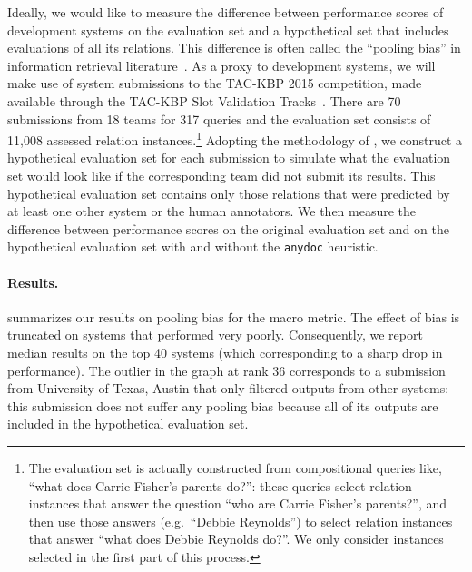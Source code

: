 Ideally, we would like to measure the difference between performance scores of development systems on the evaluation set and a hypothetical set that includes evaluations of all its relations.
This difference is often called the ``pooling bias'' in information retrieval literature~\citep{}. %
As a proxy to development systems, we will make use of system submissions to the TAC-KBP 2015 competition, made available through the TAC-KBP Slot Validation Tracks~\citep{}.
There are 70 submissions from 18 teams for 317 queries and the evaluation set consists of 11,008 assessed relation instances.\footnote{%
  The evaluation set is actually constructed from compositional queries like, ``what does Carrie Fisher's parents do?'':
  these queries select relation instances that answer the question ``who are Carrie Fisher's parents?'', and then use those answers (e.g.\ ``Debbie Reynolds'') to select relation instances that answer ``what does Debbie Reynolds do?''.
  We only consider instances selected in the first part of this process.
}
Adopting the methodology of \citet{weber2010measurement},
we construct a hypothetical evaluation set for each submission to simulate what the evaluation set would look like if the corresponding team did not submit its results.
This hypothetical evaluation set contains only those relations that were predicted by at least one other system or the human annotators.
We then measure the difference between performance scores on the original evaluation set and on the hypothetical evaluation set with and without the \texttt{anydoc} heuristic. 

\paragraph{Results.}
 summarizes our results on pooling bias for the macro \fone{} metric.
The effect of bias is truncated on systems that performed very poorly.
Consequently, we report median results on the top 40 systems (which corresponding to a sharp drop in performance).
The outlier in the graph at rank 36 corresponds to a submission from University of Texas, Austin that only filtered outputs from other systems: this submission does not suffer any pooling bias because all of its outputs are included in the hypothetical evaluation set.

